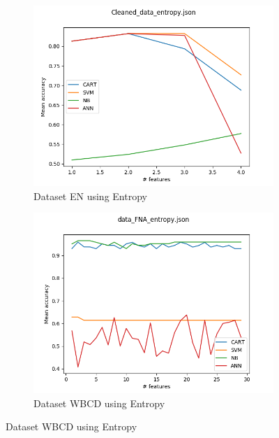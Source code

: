 \begin{figure}[htbp!]
  \centering
  \begin{subfigure}[b]{0.475\textwidth}
      \centering
      \includegraphics[width=\textwidth]{../plots_1d/Cleaned_data_entropy_combined.png}
      \caption[Network2]%
      {{\small Dataset EN using Entropy}}
      \label{fig:EN_entropy}
  \end{subfigure}
  \hfill
  \begin{subfigure}[b]{0.475\textwidth}
      \centering
      \includegraphics[width=\textwidth]{../plots_1d/data_FNA_entropy_combined.png}
      \caption[]%
      {{\small Dataset WBCD using Entropy}}
      \label{fig:WBCD_entropy}
  \end{subfigure}

\end{figure}
